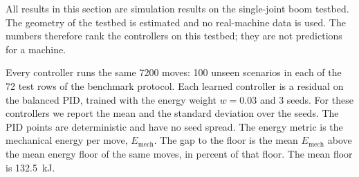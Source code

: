%
%

\label{sec:results}%
All results in this section are simulation results on the single-joint boom
testbed. The geometry of the testbed is estimated and no real-machine data is
used. The numbers therefore rank the controllers on this testbed; they are not
predictions for a machine.

Every controller runs the same 7200 moves: 100 unseen scenarios in each of the
72 test rows of the benchmark protocol. %
Each learned controller is a residual on the balanced PID, trained with the
energy weight $w = 0.03$ and 3 seeds. %
For these controllers we report the mean and the standard deviation over the
seeds. The PID points are deterministic and have no seed spread. The energy
metric is the mechanical energy per move, $E_{\mathrm{mech}}$. The gap to the
floor is the mean $E_{\mathrm{mech}}$ above the mean energy floor of the same
moves, in percent of that floor. The mean floor is 132.5~kJ. %


